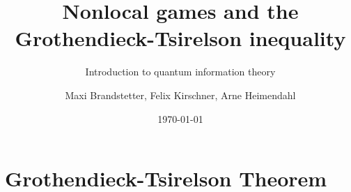 

		\author{Maxi Brandstetter, Felix Kirschner, Arne Heimendahl}
		\title{Nonlocal games and the Grothendieck-Tsirelson inequality}
		\subtitle{Introduction to quantum information theory}
			\date{\today}
		\begin{frame}
		\maketitle
	\end{frame}
	
%		
%	
%	
	\section{Grothendieck-Tsirelson Theorem}
	
	

